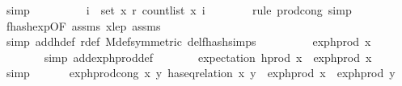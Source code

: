 \begin{isabellebody}
\ simp\isanewline
\ \ \ \ \isamarkupfalse%
\ \isamarkupfalse%
\ {\isachardoublequoteopen}{\isachardot}{\kern0pt}{\isachardot}{\kern0pt}{\isachardot}{\kern0pt}\ {\isacharequal}{\kern0pt}\ {\isacharparenleft}{\kern0pt}{\isasymProd}i\ {\isasymin}\ set\ x{\isachardot}{\kern0pt}\ r\ {\isacharparenleft}{\kern0pt}count{\isacharunderscore}{\kern0pt}list\ x\ i{\isacharparenright}{\kern0pt}{\isacharparenright}{\kern0pt}{\isachardoublequoteclose}\isanewline
\ \ \ \ \ \ \isamarkupfalse%
\ {\isacharparenleft}{\kern0pt}rule\ prod{\isachardot}{\kern0pt}cong{\isacharcomma}{\kern0pt}\ simp{\isacharparenright}{\kern0pt}\isanewline
\ \ \ \ \ \ \isamarkupfalse%
\ f{}{\isacharunderscore}{\kern0pt}hash{\isacharunderscore}{\kern0pt}exp{\isacharbrackleft}{\kern0pt}OF\ assms{\isacharparenleft}{\kern0pt}{}{\isacharparenright}{\kern0pt}\ x{\isacharunderscore}{\kern0pt}le{\isacharunderscore}{\kern0pt}p\ assms{\isacharparenleft}{\kern0pt}{}{\isacharparenright}{\kern0pt}{\isacharbrackright}{\kern0pt}\ \isanewline
\ \ \ \ \ \ \isamarkupfalse%
\ {\isacharparenleft}{\kern0pt}simp\ add{\isacharcolon}{\kern0pt}h{\isacharunderscore}{\kern0pt}def\ r{\isacharunderscore}{\kern0pt}def\ M{\isacharunderscore}{\kern0pt}def{\isacharbrackleft}{\kern0pt}symmetric{\isacharbrackright}{\kern0pt}\ del{\isacharcolon}{\kern0pt}f{}{\isacharunderscore}{\kern0pt}hash{\isachardot}{\kern0pt}simps{\isacharparenright}{\kern0pt}\isanewline
\ \ \ \ \isamarkupfalse%
\ \isamarkupfalse%
\ {\isachardoublequoteopen}{\isachardot}{\kern0pt}{\isachardot}{\kern0pt}{\isachardot}{\kern0pt}\ {\isacharequal}{\kern0pt}\ exp{\isacharunderscore}{\kern0pt}h{\isacharunderscore}{\kern0pt}prod\ x{\isachardoublequoteclose}\isanewline
\ \ \ \ \ \ \isamarkupfalse%
\ {\isacharparenleft}{\kern0pt}simp\ add{\isacharcolon}{\kern0pt}exp{\isacharunderscore}{\kern0pt}h{\isacharunderscore}{\kern0pt}prod{\isacharunderscore}{\kern0pt}def{\isacharparenright}{\kern0pt}\isanewline
\ \ \ \ \isamarkupfalse%
\ \isamarkupfalse%
\ {\isachardoublequoteopen}expectation\ {\isacharparenleft}{\kern0pt}h{\isacharunderscore}{\kern0pt}prod\ x{\isacharparenright}{\kern0pt}\ {\isacharequal}{\kern0pt}\ exp{\isacharunderscore}{\kern0pt}h{\isacharunderscore}{\kern0pt}prod\ x{\isachardoublequoteclose}\ \isamarkupfalse%
\ simp\isanewline
\ \ \isamarkupfalse%
\isanewline
\isanewline
\ \ \isamarkupfalse%
\ exp{\isacharunderscore}{\kern0pt}h{\isacharunderscore}{\kern0pt}prod{\isacharunderscore}{\kern0pt}cong{\isacharcolon}{\kern0pt}\ {\isachardoublequoteopen}{\isasymAnd}x\ y{\isachardot}{\kern0pt}\ has{\isacharunderscore}{\kern0pt}eq{\isacharunderscore}{\kern0pt}relation\ x\ y\ {\isasymLongrightarrow}\ exp{\isacharunderscore}{\kern0pt}h{\isacharunderscore}{\kern0pt}prod\ x\ {\isacharequal}{\kern0pt}\ exp{\isacharunderscore}{\kern0pt}h{\isacharunderscore}{\kern0pt}prod\ y{\isachardoublequoteclose}\ \isanewline

\end{isabellebody}
